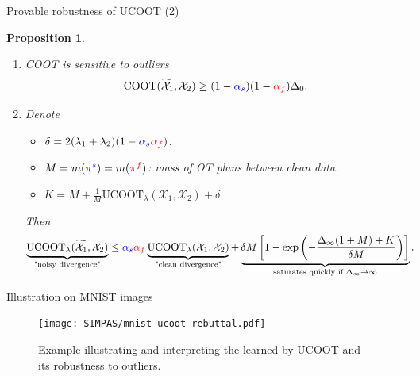 \documentclass{beamer}
\newcommand{\coot}{\text{COOT}}
\newcommand{\ucoot}{\text{UCOOT}}
\newcommand{\cX}{\mathcal X}
\newcommand{\pis}{{\color{blue}{\pi^s}}}
\newcommand{\pif}{{\color{red}{\pi^f}}}
\newtheorem{proposition}{Proposition}[section]
\begin{document}
\begin{frame}{Provable robustness of UCOOT (2)}
\tiny
\begin{proposition}
  \begin{enumerate}
    \item COOT is sensitive to outliers
    \begin{equation*}
        \coot(\widetilde{\cX_1}, \cX_2) \geq (1 - {\color{blue}{\alpha_s}})(1 - {\color{red}{\alpha_f}})\Delta_0.
    \end{equation*}

    \item Denote
    \begin{itemize}
      \tiny
      \item $\delta = 2(\lambda_1 + \lambda_2)(1 - {\color{blue}{\alpha_s}} {\color{red}{\alpha_f}})$.

      \item $M= m(\pis) = m(\pif)$: mass of OT plans between clean data.

      \item $K = M + \frac{1}{M}\ucoot_{\lambda}(\cX_1, \cX_2) + \delta$.
    \end{itemize}
    Then
    \begin{equation*} %
    \begin{split}
      \underbrace{\ucoot_{\lambda}(\widetilde{\cX_1}, \cX_2)}_{\text{"noisy divergence"}}
      &\leq {\color{blue}{\alpha_s}} {\color{red}{\alpha_f}}
      \underbrace{\ucoot_{\lambda}(\cX_1, \cX_2)}_{\text{"clean divergence"}}
      + \underbrace{\delta M \left[ 1 -
      \exp \left( {- \frac{\Delta_{\infty}(1+M) + K}{\delta M}} \right) \right]}_{\text{saturates quickly if } \Delta_{\infty} \to \infty}.
    \end{split}
    \end{equation*}
  \end{enumerate}
\end{proposition}
\end{frame}

\begin{frame}{Illustration on MNIST images}
\tiny
\begin{figure}
    \centering
    \texttt{[image: SIMPAS/mnist-ucoot-rebuttal.pdf]}
    \caption*{Example illustrating and interpreting the {\color{red}{feature alignment $\pi^f$}} learned by UCOOT and its robustness to outliers.}
\end{figure}
\end{frame}
\end{document}
